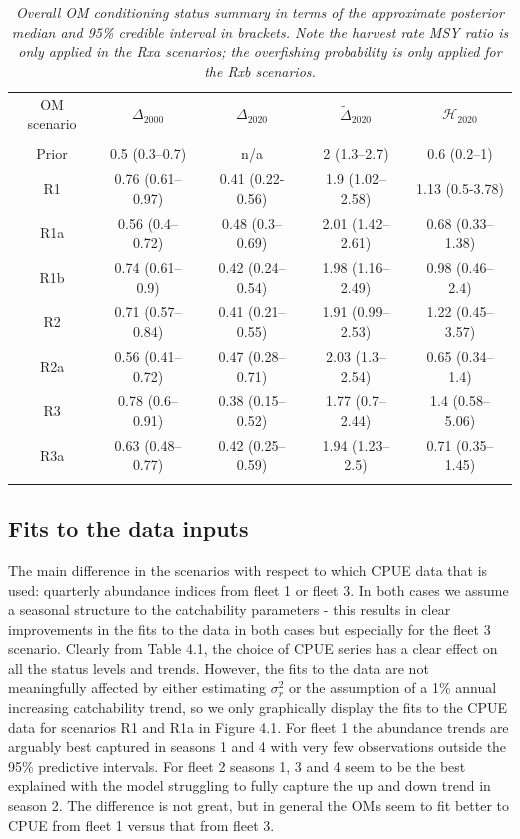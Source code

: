 \documentclass[11pt]{article}
\newcommand{\sigr}{\sigma^2_r}
\begin{document}
\begin{table}[hb]
    \begin{center}
        \begin{tabular}{|ccccc|}
            \hline
            OM scenario & $\Delta_{2000}$ & $\Delta_{2020}$ & $\tilde{\Delta}_{2020}$ & $\mathcal{H}_{2020}$\\
            & & & & \\
Prior & 0.5 (0.3–0.7)    & n/a              & 2 (1.3–2.7)      & 0.6 (0.2–1) \\
R1    & 0.76 (0.61–0.97) & 0.41 (0.22-0.56) & 1.9 (1.02–2.58)  & 1.13 (0.5-3.78) \\
R1a   & 0.56 (0.4–0.72)  & 0.48 (0.3–0.69)  & 2.01 (1.42–2.61) & 0.68 (0.33–1.38) \\
R1b   & 0.74 (0.61–0.9)  & 0.42 (0.24–0.54) & 1.98 (1.16–2.49) & 0.98 (0.46–2.4) \\
R2    & 0.71 (0.57–0.84) & 0.41 (0.21–0.55) & 1.91 (0.99–2.53) & 1.22 (0.45–3.57) \\
R2a   & 0.56 (0.41–0.72) & 0.47 (0.28–0.71) & 2.03 (1.3–2.54)  & 0.65 (0.34–1.4) \\
R3    & 0.78 (0.6–0.91)  & 0.38 (0.15–0.52) & 1.77 (0.7–2.44)  & 1.4 (0.58–5.06) \\
R3a   & 0.63 (0.48–0.77) & 0.42 (0.25–0.59) & 1.94 (1.23–2.5)  & 0.71 (0.35–1.45) \\
            & & & & \\
            \hline
        \end{tabular}
    \end{center}
    \caption{\textit{Overall OM conditioning status summary in terms of the approximate posterior median and 95\% credible interval in brackets. Note the harvest rate MSY ratio is only applied in the Rxa scenarios; the overfishing probability is only applied for the Rxb scenarios.}}
\end{table}

\subsection{Fits to the data inputs}

The main difference in the scenarios with respect to which CPUE data that is used: quarterly
abundance indices from fleet 1 or fleet 3. In both cases we assume a seasonal structure to the
catchability parameters - this results in clear improvements in the fits to the data in both cases
but especially for the fleet 3 scenario. Clearly from Table 4.1, the choice of CPUE series has a
clear effect on all the status levels and trends. However, the fits to the data are not meaningfully
affected by either estimating $\sigr$ or the assumption of a 1\% annual increasing catchability trend,
so we only graphically display the fits to the CPUE data for scenarios R1 and R1a in Figure 4.1.
For fleet 1 the abundance trends are arguably best captured in seasons 1 and 4 with very few
observations outside the 95\% predictive intervals. For fleet 2 seasons 1, 3 and 4 seem to be the
best explained with the model struggling to fully capture the up and down trend in season 2. The
difference is not great, but in general the OMs seem to fit better to CPUE from fleet 1 versus that
from fleet 3.
\end{document}
